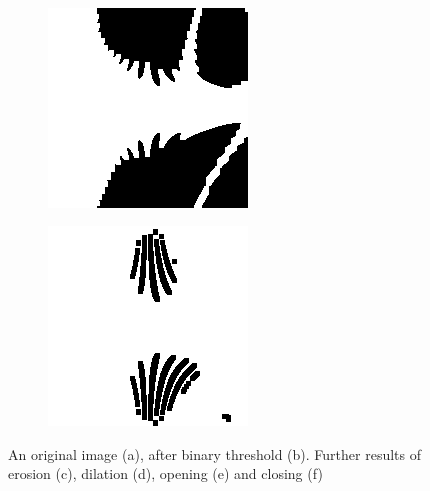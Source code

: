 \documentclass[a4paper,12pt,notitlepage]{article}
\begin{document}
\begin{figure}[H]
\begin{subfigure}[b]{0.4\textwidth}
					\caption{}
				\end{subfigure}\\
				\begin{subfigure}[b]{0.4\textwidth}
					\centering
					\includegraphics[width=\textwidth]{chris/image10}
					\caption{}
				\end{subfigure}
				\begin{subfigure}[b]{0.4\textwidth}
					\centering
					\includegraphics[width=\textwidth]{chris/image11}
					\caption{}
				\end{subfigure}
				\caption{An original image (a), after binary threshold (b). Further results of erosion (c), dilation (d), opening (e) and closing (f)}
				\label{fig:morph}
			\end{figure}
\end{document}
